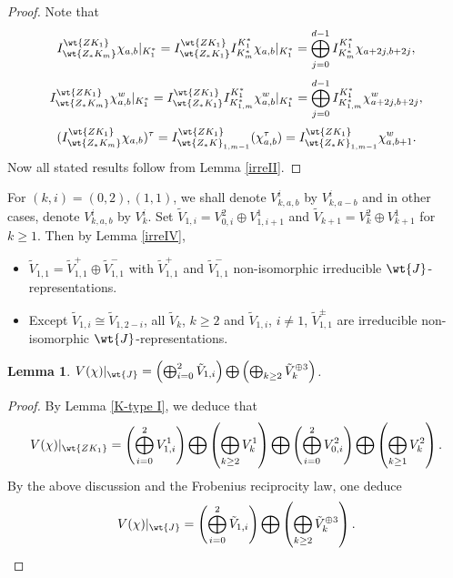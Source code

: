 \documentclass[11pt,reqno]{amsart}
\theoremstyle{plain}
\newtheorem{lem}[thm]{Lemma}  \newtheorem{prop}[thm]{Proposition}
\theoremstyle{remark} \newtheorem{remark}[thm]{Remark}
\theoremstyle{definition} \newtheorem{exercise}[thm]{Exercise}
\theoremstyle{definition} \newtheorem{example}[thm]{Example} \newtheorem{condition}[thm]{Condition}
\numberwithin{equation}{section}
\renewcommand{\-}{\text{--}}
\begin{document}
\begin{proof}Note that \[I_{\wt{Z_*K_m}}^{\wt{ZK_1}}\chi_{a,b}|_{K_1^*}=I_{\wt{Z_*K_1}}^{\wt{ZK_1}}I_{K_m^*}^{K_1^*}\chi_{a,b}|_{K_1^*}=\bigoplus_{j=0}^{d-1}I_{K_m^*}^{K_1^*}\chi_{a+2j,b+2j},\]
\[I_{\wt{Z_*K_m}}^{\wt{ZK_1}}\chi_{a,b}^w|_{K_1^*}=I_{\wt{Z_*K_1}}^{\wt{ZK_1}}I_{K_{1,m}^*}^{K_1^*}\chi^w_{a,b}|_{K_1^*}=\bigoplus_{j=0}^{d-1}I_{K_{1,m}^*}^{K_1^*}\chi^w_{a+2j,b+2j},\]
\[(I_{\wt{Z_*K_m}}^{\wt{ZK_1}}\chi_{a,b})^\tau=I_{\wt{Z_*K}_{1,m-1}}^{\wt{ZK_1}}(\chi_{a,b}^\tau)=I_{\wt{Z_*K}_{1,m-1}}^{\wt{ZK_1}}\chi_{a,b+1}^w.\]
Now all stated results follow from Lemma \ref{irreII}. 
\end{proof}
For $(k,i)=(0,2),(1,1)$, we shall   denote $V^i_{k,a,b}$ by $V^i_{k,a-b}$ and in other cases,   denote $V^i_{k,a,b}$ by $V_k^i$. Set $\tilde{V}_{1,i}=V_{0,i}^2\oplus V_{1,i+1}^1$ and $\tilde{V}_{k+1}=V_k^2\oplus V_{k+1}^1$ for $k\geq1$. Then by Lemma \ref{irreIV}, 
\begin{itemize}
\item $\tilde{V}_{1,1}=\tilde{V}_{1,1}^+\oplus \tilde{V}_{1,1}^-$ with  $\tilde{V}_{1,1}^+$ and $ \tilde{V}_{1,1}^-$ non-isomorphic irreducible $\wt{J}$-representations.
    \item Except $\tilde{V}_{1,i}\cong \tilde{V}_{1,2-i}$, all  $\tilde{V}_{k}$, $k\geq 2$ and $\tilde{V}_{1,i}$, $i\neq 1$, $\tilde{V}_{1,1}^\pm$ are irreducible non-isomorphic $\wt{J}$-representations. 
\end{itemize}
\begin{lem}\label{K-type II}$V(\chi)|_{\wt{J}}=\left(\bigoplus_{i=0}^{2} \tilde{V}_{1,i}\right)\bigoplus \left(\bigoplus_{k\geq2}\tilde{V}_k^{\oplus 3}\right)$.
\end{lem}
\begin{proof}By Lemma \ref{K-type I}, we deduce that  \[V(\chi)|_{\wt{ZK_1}}=\left(\bigoplus_{i=0}^{2}V_{1,i}^1\right)\bigoplus
\left(\bigoplus_{k\geq2}V_k^1\right)\bigoplus \left(\bigoplus_{i=0}^{2}V_{0,i}^2\right)\bigoplus
\left(\bigoplus_{k\geq1}V_k^2\right).\] 
By the above discussion and the Frobenius reciprocity law, one deduce
\[V(\chi)|_{\wt{J}}=\left(\bigoplus_{i=0}^{2} \tilde{V}_{1,i}\right)\bigoplus \left(\bigoplus_{k\geq2}\tilde{V}_k^{\oplus 3}\right).\] 
\end{proof}
\end{document}
